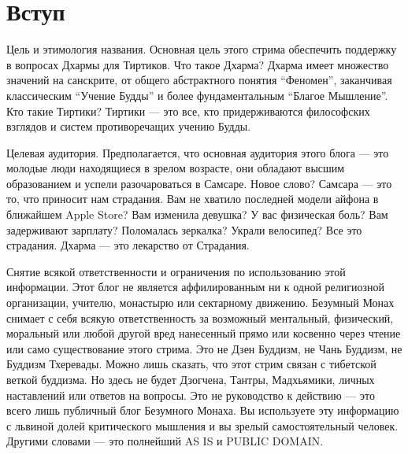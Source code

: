 \section{Вступ}

Цель и этимология названия.
Основная цель этого стрима обеспечить поддержку
в вопросах Дхармы для Тиртиков. Что такое Дхарма?
Дхарма имеет множество значений на санскрите, от
общего абстрактного понятия “Феномен”, заканчивая
классическим “Учение Будды” и более фундаментальным
“Благое Мышление”. Кто такие Тиртики? Тиртики — это
все, кто придерживаются философских взглядов и систем
противоречащих учению Будды.

Целевая аудитория. Предполагается, что основная аудитория этого блога — это молодые люди находящиеся в зрелом возрасте, они обладают высшим образованием и успели разочароваться в Самсаре. Новое слово? Самсара — это то, что приносит нам страдания. Вам не хватило последней модели айфона в ближайшем Apple Store? Вам изменила девушка? У вас физическая боль? Вам задерживают зарплату? Поломалась зеркалка? Украли велосипед? Все это страдания. Дхарма — это лекарство от Страдания.

Снятие всякой ответственности и ограничения по использованию этой информации. Этот блог не является аффилированным ни к одной религиозной организации, учителю, монастырю или сектарному движению. Безумный Монах снимает с себя всякую ответственность за возможный ментальный, физический, моральный или любой другой вред нанесенный прямо или косвенно через чтение или само существование этого стрима.  Это не Дзен Буддизм, не Чань Буддизм, не Буддизм Тхеревады. Можно лишь сказать, что этот стрим связан с тибетской веткой буддизма. Но здесь не будет Дзогчена, Тантры, Мадхьямики, личных наставлений или ответов на вопросы. Это не руководство к действию — это всего лишь публичный блог Безумного Монаха. Вы используете эту информацию с львиной долей критического мышления и вы зрелый самостоятельный человек. Другими словами — это полнейший AS IS и PUBLIC DOMAIN.
